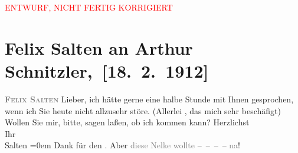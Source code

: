 
\begin{center}
            \textcolor{red}{ENTWURF, NICHT FERTIG KORRIGIERT}
                      \end{center}
            
         \renewcommand{\erwaehnteInstitutionen}{Institutionen: Bauernfeld-Preis}
         \renewcommand{\erwaehnteOrte}{Orte: Wien}
         \renewcommand{\erwaehnteWerke}{}
               \section[ Felix Salten an Arthur Schnitzler, {[}18. 2. 1912{]}]{ Felix Salten an Arthur Schnitzler, {[}18. 2. 1912{]}}\nopagebreak{}\rehead{ }\begin{ledgroupsized}[t]{13cm}\normalsize\beginnumbering \toendnotes[C]{\smallbreak\pagebreak[2]} 
\toendnotes[C]{\smallbreak}\pstart
           \noindent{}\centering{}{\pb}\textcolor{gray}{\textbf{\textcolor{gray}{\textbf{\textsc{Felix Salten}}}}}\pend
           \pstart
           Lieber, ich hätte gerne eine halbe Stunde mit Ihnen gesprochen, wenn
               ich Sie heute nicht allzusehr störe. (Allerlei \label{K_L03556-1v}\label{K_L03556-1h}, das mich sehr beschäfigt) Wollen Sie mir, bitte, sagen laßen, ob ich kommen
               kann?\pend
           \pstart
           Herzlichst{\\[\baselineskip]} Ihr {\\[\baselineskip]}\spacefill\mbox{Salten}\pend
           \leftskip=0em{}\pstart
           \noindent{}Dank für den \label{K_L03556-2v}\label{K_L03556-2h}.
                  Aber \textcolor{gray}{diese Nelke wollte} – – – – \textcolor{gray}{na}!\pend
           
         
         \endnumbering{}\end{ledgroupsized}  \newcommand{\dateiname}{L03556}\newcommand{\titel}{Felix Salten an Arthur Schnitzler, [18. 2. 1912]}\newcommand{\editorInnen}{Martin Anton Müller und Laura Untner}
      